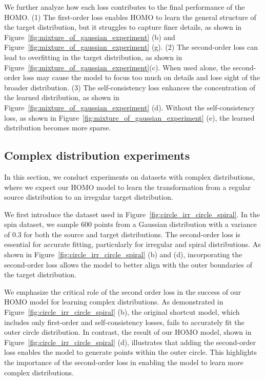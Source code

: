 We further analyze how each loss contributes to the final performance of the HOMO. (1) The first-order loss enables HOMO to learn the general structure of the target distribution, but it struggles to capture finer details, as shown in Figure~\ref{fig:mixture_of_gaussian_experiment} (b) and Figure~\ref{fig:mixture_of_gaussian_experiment} (g). (2) The second-order loss can lead to overfitting in the target distribution, as shown in Figure~\ref{fig:mixture_of_gaussian_experiment}(c). When used alone, the second-order loss may cause the model to focus too much on details and lose sight of the broader distribution. (3) The self-consistency loss enhances the concentration of the learned distribution, as shown in Figure~\ref{fig:mixture_of_gaussian_experiment} (d). Without the self-consistency loss, as shown in Figure~\ref{fig:mixture_of_gaussian_experiment} (e), the learned distribution becomes more sparse. 

\subsection{Complex distribution experiments} \label{sec:exp:complex_distribution}
In this section, we conduct experiments on datasets with complex distributions, where we expect our HOMO model to learn the transformation from a regular source distribution to an irregular target distribution.

We first introduce the dataset used in Figure~\ref{fig:circle_irr_circle_spiral}. In the spin dataset, we sample $600$ points from a Gaussian distribution with a variance of $0.3$ for both the source and target distributions.
The second-order loss is essential for accurate fitting, particularly for irregular and spiral distributions. As shown in Figure~\ref{fig:circle_irr_circle_spiral} (b) and (d), incorporating the second-order loss allows the model to better align with the outer boundaries of the target distribution.

We emphasize the critical role of the second order loss in the success of our HOMO model for learning complex distributions. As demonstrated in Figure~\ref{fig:circle_irr_circle_spiral} (b), the original shortcut model, which includes only first-order and self-consistency losses, fails to accurately fit the outer circle distribution. In contrast, the result of our HOMO model, shown in Figure~\ref{fig:circle_irr_circle_spiral} (d), illustrates that adding the second-order loss enables the model to generate points within the outer circle. This highlights the importance of the second-order loss in enabling the model to learn more complex distributions.

